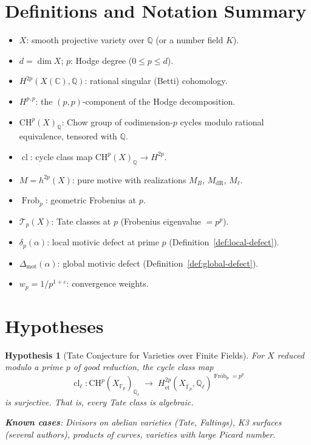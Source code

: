 \documentclass[11pt]{article}
\newtheorem{hypothesis}[lemma]{Hypothesis}
\theoremstyle{definition}
\DeclareMathOperator{\Frob}{Frob}
\DeclareMathOperator{\cl}{cl}
\begin{document}
\section{Definitions and Notation Summary}

\begin{itemize}
  \item $X$: smooth projective variety over $\mathbb{Q}$ (or a number field $K$).
  \item $d = \dim X$; $p$: Hodge degree ($0 \leq p \leq d$).
  \item $H^{2p}(X(\mathbb{C}), \mathbb{Q})$: rational singular (Betti) cohomology.
  \item $H^{p,p}$: the $(p,p)$-component of the Hodge decomposition.
  \item $\mathrm{CH}^p(X)_{\mathbb{Q}}$: Chow group of codimension-$p$ cycles modulo rational equivalence, tensored with $\mathbb{Q}$.
  \item $\cl$: cycle class map $\mathrm{CH}^p(X)_{\mathbb{Q}} \to H^{2p}$.
  \item $M = h^{2p}(X)$: pure motive with realizations $M_B$, $M_{\mathrm{dR}}$, $M_\ell$.
  \item $\Frob_p$: geometric Frobenius at $p$.
  \item $\mathcal{T}_p(X)$: Tate classes at $p$ (Frobenius eigenvalue $= p^p$).
  \item $\delta_p(\alpha)$: local motivic defect at prime $p$ (Definition~\ref{def:local-defect}).
  \item $\Delta_{\mathrm{mot}}(\alpha)$: global motivic defect (Definition~\ref{def:global-defect}).
  \item $w_p = 1/p^{1+\varepsilon}$: convergence weights.
\end{itemize}

\section{Hypotheses}

\begin{hypothesis}[Tate Conjecture for Varieties over Finite Fields]
\label{hyp:tate}
For $X$ reduced modulo a prime $p$ of good reduction, the cycle class map
\[
  \cl_\ell : \mathrm{CH}^p(X_{\mathbb{F}_p})_{\mathbb{Q}_\ell} \;\longrightarrow\; H^{2p}_{\mathrm{\acute{e}t}}(X_{\bar{\mathbb{F}}_p}, \mathbb{Q}_\ell)^{\Frob_p = p^p}
\]
is surjective.  That is, every Tate class is algebraic.

\textbf{Known cases}: Divisors on abelian varieties (Tate, Faltings), K3 surfaces (several authors),
products of curves, varieties with large Picard number.
\end{hypothesis}
\end{document}
